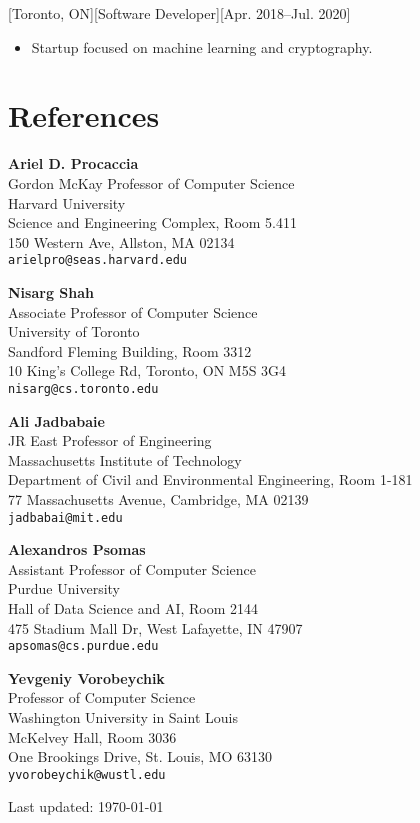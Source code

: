 \documentclass{article}
\begin{document}
    
    [Toronto, ON][Software Developer][Apr. 2018--Jul. 2020]
    \begin{itemize}[noitemsep,nolistsep]
        \item Startup focused on machine learning and cryptography. 
    \end{itemize}
    

\section{References}


\textbf{Ariel D. Procaccia} \\
Gordon McKay Professor of Computer Science \\
Harvard University \\
Science and Engineering Complex, Room 5.411\\
150 Western Ave, Allston, MA 02134 \\
\texttt{arielpro@seas.harvard.edu}
\vspace{0.4em}


\textbf{Nisarg Shah} \\
Associate Professor of Computer Science\\
University of Toronto \\
Sandford Fleming Building, Room 3312\\
10 King's College Rd, Toronto, ON M5S 3G4 \\
\texttt{nisarg@cs.toronto.edu}
\vspace{0.4em}


\textbf{Ali Jadbabaie} \\
JR East Professor of Engineering \\
Massachusetts Institute of Technology \\
Department of Civil and Environmental Engineering, Room 1-181\\
77 Massachusetts Avenue, Cambridge, MA 02139 \\
\texttt{jadbabai@mit.edu}
\vspace{0.4em}


\textbf{Alexandros Psomas} \\
Assistant Professor of Computer Science \\
Purdue University \\
Hall of Data Science and AI, Room 2144\\
475 Stadium Mall Dr, West Lafayette, IN 47907 \\
\texttt{apsomas@cs.purdue.edu}
\vspace{0.4em}


\textbf{Yevgeniy Vorobeychik} \\
Professor of Computer Science\\
Washington University in Saint Louis \\
McKelvey Hall, Room 3036\\
One Brookings Drive, St. Louis, MO 63130 \\
\texttt{yvorobeychik@wustl.edu}


    \vfill
\begin{center}
    Last updated: \today
\end{center}
    
\end{document}
